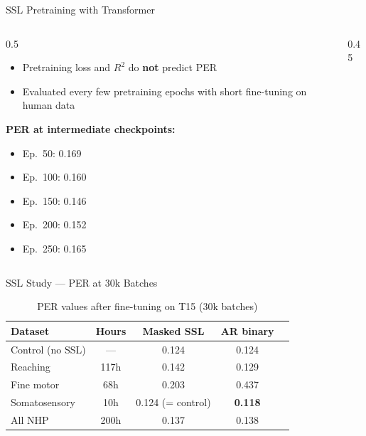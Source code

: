 \documentclass[aspectratio=169]{beamer}
\begin{document}
\begin{frame}{SSL Pretraining with Transformer}
  \begin{columns}
    \begin{column}{0.5\textwidth}
      \begin{itemize}
        \item Pretraining loss and $R^2$ do \textbf{not} predict PER
        \item Evaluated every few pretraining epochs with short fine-tuning on human data
      \end{itemize}
      \vspace{0.5em}
      \textbf{PER at intermediate checkpoints:}
      \begin{itemize}
        \item Ep.\ 50:  0.169
        \item Ep.\ 100: 0.160
        \item Ep.\ 150: 0.146
        \item Ep.\ 200: 0.152
        \item Ep.\ 250: 0.165
      \end{itemize}
    \end{column}
    \begin{column}{0.45\textwidth}
      \begin{center}
      \end{center}
    \end{column}
  \end{columns}
\end{frame}

\begin{frame}{SSL Study — PER at 30k Batches}
  \begin{table}
    \centering
    \begin{tabular}{lcccc}
      \toprule
      \textbf{Dataset} & \textbf{Hours} & \textbf{Masked SSL} & \textbf{AR binary} \\
      \midrule
      Control (no SSL)  & ---   & 0.124              & 0.124 \\
      Reaching          & 117h  & 0.142              & 0.129 \\
      Fine motor        & 68h   & 0.203              & 0.437 \\
      Somatosensory     & 10h   & 0.124 (= control)  & \textbf{0.118} \\
      All NHP           & 200h  & 0.137              & 0.138 \\
      \bottomrule
    \end{tabular}
    \caption{PER values after fine-tuning on T15 (30k batches)}
  \end{table}
\end{frame}
\end{document}
